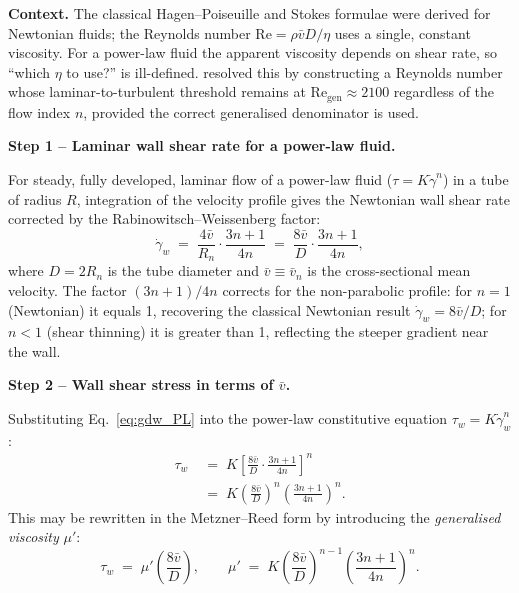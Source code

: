 \documentclass[11pt,a4paper]{article}
\newcommand{\gd}{\dot{\gamma}}
\newcommand{\Rey}{\mathrm{Re}}
\begin{document}
\begin{derivationbox}[title={DERIVATION --- Generalised (Metzner--Reed) Reynolds number}]
\label{box:metzner_reed}

\textbf{Context.}
The classical Hagen--Poiseuille and Stokes formulae were derived for
Newtonian fluids; the Reynolds number $\Rey=\rho\bar v D/\eta$ uses a
single, constant viscosity. For a power-law fluid the apparent viscosity
depends on shear rate, so ``which $\eta$ to use?'' is ill-defined.
\citet{MetznerReed1955} resolved this by constructing a Reynolds number
whose laminar-to-turbulent threshold remains at $\Rey_\mathrm{gen}\approx 2100$
regardless of the flow index $n$, provided the correct generalised
denominator is used.

\medskip
\noindent\textbf{Step 1 -- Laminar wall shear rate for a power-law fluid.}

For steady, fully developed, laminar flow of a power-law fluid
($\tau=K\gd^n$) in a tube of radius $R$, integration of the velocity
profile gives the Newtonian wall shear rate corrected by the
Rabinowitsch--Weissenberg factor:
\begin{equation}
\gd_w \;=\; \frac{4\bar v}{R_n}
            \cdot\frac{3n+1}{4n}
           \;=\; \frac{8\bar v}{D}
            \cdot\frac{3n+1}{4n},
\label{eq:gdw_PL}
\end{equation}
where $D=2R_n$ is the tube diameter and $\bar v \equiv \bar v_n$ is the
cross-sectional mean velocity. The factor $(3n+1)/4n$ corrects for the
non-parabolic profile: for $n=1$ (Newtonian) it equals 1, recovering the
classical Newtonian result $\gd_w=8\bar v/D$; for $n<1$ (shear thinning)
it is greater than 1, reflecting the steeper gradient near the wall.

\medskip
\noindent\textbf{Step 2 -- Wall shear stress in terms of $\bar v$.}

Substituting Eq.~\ref{eq:gdw_PL} into the power-law constitutive equation
$\tau_w = K\gd_w^n$:
\begin{align}
\tau_w
  &\;=\; K\!\left[\frac{8\bar v}{D}
         \cdot\frac{3n+1}{4n}\right]^{\!n}
\nonumber\\
  &\;=\; K\!\left(\frac{8\bar v}{D}\right)^{\!n}
         \!\left(\frac{3n+1}{4n}\right)^{\!n}.
\label{eq:tau_w_PL_vbar}
\end{align}
This may be rewritten in the Metzner--Reed form by introducing the
\emph{generalised viscosity} $\mu'$:
\begin{equation}
\tau_w \;=\; \mu'\!\left(\frac{8\bar v}{D}\right),
\qquad
\mu' \;=\; K\!\left(\frac{8\bar v}{D}\right)^{\!n-1}
            \left(\frac{3n+1}{4n}\right)^{\!n}.
\label{eq:mu_prime}
\end{equation}


\end{derivationbox}
\end{document}

